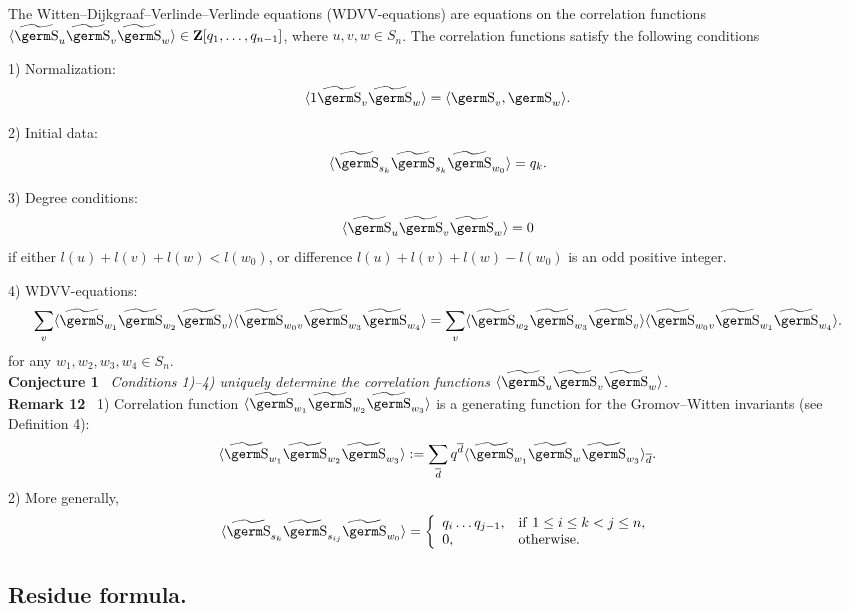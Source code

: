{{The Witten--Dijkgraaf--Verlinde--Verlinde equations (WDVV-equations) are 
equations on the correlation functions 
$\langle\wt{\s}_u\wt{\s}_v\wt{\s}_w\rangle\in{\bf Z}[q_1,\ldots 
,q_{n-1}]$, where $u,v,w\in S_n$. The correlation functions satisfy the 
following conditions

1) Normalization: 
$$\langle 1\wt{\s}_v\wt{\s}_w\rangle =\langle 
\s_v,\s_w\rangle .
$$

2) Initial data: 
$$\langle \wt{\s}_{s_k}\wt{\s}_{s_k}\wt{\s}_{w_0}\rangle =q_k.
$$

3) Degree conditions:
$$\langle\wt{\s}_u\wt{\s}_v\wt{\s}_w\rangle =0
$$
if either $l(u)+l(v)+l(w)<l(w_0)$, or difference $l(u)+l(v)+l(w)-l(w_0)$
is an odd positive integer.

4) WDVV-equations: 
$$\sum_v\langle\wt{\s}_{w_1}\wt{\s}_{w_2}\wt{\s}_v\rangle
\langle\wt{\s}_{w_0v}\wt{\s}_{w_3}\wt{\s}_{w_4}\rangle =
\sum_v\langle\wt{\s}_{w_2}\wt{\s}_{w_3}\wt{\s}_v\rangle
\langle\wt{\s}_{w_0v}\wt{\s}_{w_1}\wt{\s}_{w_4}\rangle .
$$
for any $w_1,w_2,w_3,w_4\in S_n$. \smallskip \\ 
{\bf Conjecture 1} \ {\it Conditions 1)--4) uniquely determine the correlation 
functions $\langle\wt{\s}_u\wt{\s}_v\wt{\s}_w\rangle$.}
\smallskip \\
{\bf Remark 12} \ 1) Correlation function 
$\langle\wt{\s}_{w_1}\wt{\s}_{w_2}\wt{\s}_{w_3}\rangle $ is a 
generating function for the Gromov--Witten invariants (see Definition 4):
$$\langle\wt{\s}_{w_1}\wt{\s}_{w_2}\wt{\s}_{w_3}\rangle :=
\ds\sum_{\overline d}q^{\overline d}\langle\wt{\s}_{w_1}\wt{\s}_w\wt{\s}_{w_3}
\rangle_{\overline d}.
$$
2) More generally,
$$\langle\wt{\s}_{s_k}\wt{\s}_{s_{ij}}\wt{\s}_{w_0}\rangle 
=\left\{\begin{array}{ll} q_i\ldots q_{j-1}, & {\rm if} \ 1\le i\le 
k<j\le n,\\ 0, & {\rm otherwise}.\end{array}\right.
$$

\subsection{Residue formula.} 

}}
